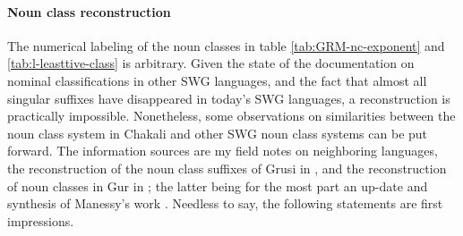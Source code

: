 \paragraph{Noun class reconstruction}
\label{sec:GRM-noun-class-recons}
The numerical labeling of the noun classes in table \ref{tab:GRM-nc-exponent}
and \ref{tab:l-leasttive-class} is arbitrary. Given  the state of the
documentation on nominal classifications in other SWG languages, and the fact
that  almost all singular suffixes
have disappeared in today's SWG languages, a reconstruction  is practically
impossible. Nonetheless,  some 
observations  on similarities between the noun class
system in Chakali and other SWG noun class systems can be put forward. The
information sources are my field notes on neighboring languages, the
reconstruction of the
noun class suffixes of Grusi in \cite{Mane69a, Mane69b},  and the reconstruction
of noun classes in Gur in \cite{Mieh06}; the latter being for the most part an
up-date and synthesis of Manessy's work \citep{Mane69a, Mane69b, Mane75, Mane79,
Mane82, Mane99}. Needless to say, the following statements are first
impressions.


